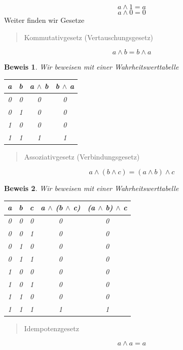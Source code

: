 \documentclass{report}
\newtheorem{myproof}{Beweis}
\begin{document}
\begin{equation}a \land 1 = a\end{equation}
\begin{equation}a \land 0 = 0\end{equation}
Weiter finden wir Gesetze
\begin{quote}Kommutativgesetz (Vertauschungsgesetz)\end{quote}
\begin{equation}a \land b = b \land a\end{equation}
\begin{myproof}Wir beweisen mit einer Wahrheitswerttabelle
\begin{center}\begin{tabular}{c c | c c}
a & b & a \(\land\) b & b \(\land\) a\\
\hline
0 & 0 & 0 & 0  \\
0 & 1 & 0 & 0  \\
1 & 0 & 0 & 0 \\
1 & 1 & 1 & 1 \\
\end{tabular}\end{center}\end{myproof}
\begin{quote}Assoziativgesetz (Verbindungsgesetz)\end{quote}
\begin{equation}a \land (b \land c) = (a \land b) \land c\end{equation}
\begin{myproof}Wir beweisen mit einer Wahrheitswerttabelle
\begin{center}\begin{tabular}{c c c | c c}
a & b & c & a \(\land\) (b \(\land\) c) & (a \(\land\) b) \(\land\) c\\
\hline
0 & 0 & 0 & 0 & 0  \\
0 & 0 & 1 & 0 & 0  \\
0 & 1 & 0 & 0 & 0 \\
0 & 1 & 1 & 0 & 0 \\
1 & 0 & 0 & 0 & 0 \\
1 & 0 & 1 & 0 & 0 \\
1 & 1 & 0 & 0 & 0 \\
1 & 1 & 1 & 1 & 1 \\
\end{tabular}\end{center}\end{myproof}
\begin{quote}Idempotenzgesetz\end{quote}
\begin{equation}a \land a = a\end{equation}
\end{document}
